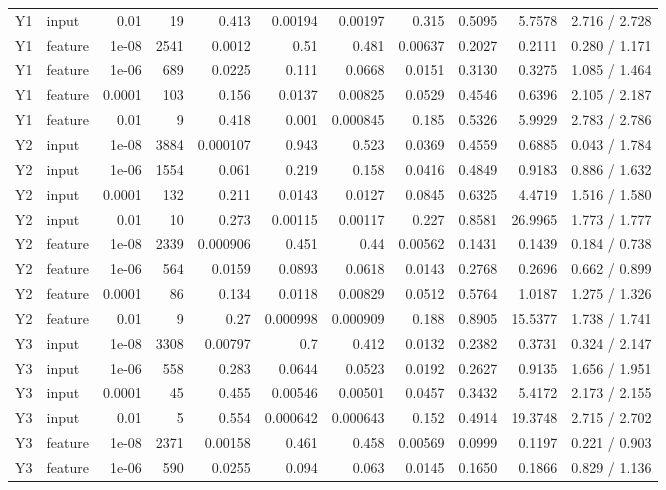 \begin{landscape}
{\begin{longtable}{llrrrrrrrrr}
Y1 & input & 0.01 & 19 & 0.413 & 0.00194 & 0.00197 & 0.315 & 0.5095 & 5.7578 & 2.716 / 2.728 \\
Y1 & feature & 1e-08 & 2541 & 0.0012 & 0.51 & 0.481 & 0.00637 & 0.2027 & 0.2111 & 0.280 / 1.171 \\
Y1 & feature & 1e-06 & 689 & 0.0225 & 0.111 & 0.0668 & 0.0151 & 0.3130 & 0.3275 & 1.085 / 1.464 \\
Y1 & feature & 0.0001 & 103 & 0.156 & 0.0137 & 0.00825 & 0.0529 & 0.4546 & 0.6396 & 2.105 / 2.187 \\
Y1 & feature & 0.01 & 9 & 0.418 & 0.001 & 0.000845 & 0.185 & 0.5326 & 5.9929 & 2.783 / 2.786 \\
Y2 & input & 1e-08 & 3884 & 0.000107 & 0.943 & 0.523 & 0.0369 & 0.4559 & 0.6885 & 0.043 / 1.784 \\
Y2 & input & 1e-06 & 1554 & 0.061 & 0.219 & 0.158 & 0.0416 & 0.4849 & 0.9183 & 0.886 / 1.632 \\
Y2 & input & 0.0001 & 132 & 0.211 & 0.0143 & 0.0127 & 0.0845 & 0.6325 & 4.4719 & 1.516 / 1.580 \\
Y2 & input & 0.01 & 10 & 0.273 & 0.00115 & 0.00117 & 0.227 & 0.8581 & 26.9965 & 1.773 / 1.777 \\
Y2 & feature & 1e-08 & 2339 & 0.000906 & 0.451 & 0.44 & 0.00562 & 0.1431 & 0.1439 & 0.184 / 0.738 \\
Y2 & feature & 1e-06 & 564 & 0.0159 & 0.0893 & 0.0618 & 0.0143 & 0.2768 & 0.2696 & 0.662 / 0.899 \\
Y2 & feature & 0.0001 & 86 & 0.134 & 0.0118 & 0.00829 & 0.0512 & 0.5764 & 1.0187 & 1.275 / 1.326 \\
Y2 & feature & 0.01 & 9 & 0.27 & 0.000998 & 0.000909 & 0.188 & 0.8905 & 15.5377 & 1.738 / 1.741 \\
Y3 & input & 1e-08 & 3308 & 0.00797 & 0.7 & 0.412 & 0.0132 & 0.2382 & 0.3731 & 0.324 / 2.147 \\
Y3 & input & 1e-06 & 558 & 0.283 & 0.0644 & 0.0523 & 0.0192 & 0.2627 & 0.9135 & 1.656 / 1.951 \\
Y3 & input & 0.0001 & 45 & 0.455 & 0.00546 & 0.00501 & 0.0457 & 0.3432 & 5.4172 & 2.173 / 2.155 \\
Y3 & input & 0.01 & 5 & 0.554 & 0.000642 & 0.000643 & 0.152 & 0.4914 & 19.3748 & 2.715 / 2.702 \\
Y3 & feature & 1e-08 & 2371 & 0.00158 & 0.461 & 0.458 & 0.00569 & 0.0999 & 0.1197 & 0.221 / 0.903 \\
Y3 & feature & 1e-06 & 590 & 0.0255 & 0.094 & 0.063 & 0.0145 & 0.1650 & 0.1866 & 0.829 / 1.136 \\

\end{longtable}}
\end{landscape}
